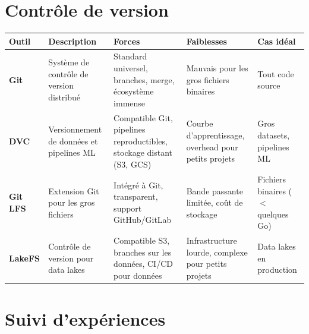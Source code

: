 \section{Contr\^ole de version}
\label{app:version-control}

\begin{center}
\small
\begin{tabular}{@{}p{1.8cm}p{3cm}p{3cm}p{3cm}p{2cm}@{}}
\toprule
\textbf{Outil} & \textbf{Description} & \textbf{Forces} &
  \textbf{Faiblesses} & \textbf{Cas id\'eal} \\
\midrule
\textbf{Git} & Syst\`eme de contr\^ole de version distribu\'e &
  Standard universel, branches, merge, \'ecosyst\`eme immense &
  Mauvais pour les gros fichiers binaires &
  Tout code source \\
\addlinespace
\textbf{DVC} & Versionnement de donn\'ees et pipelines ML &
  Compatible Git, pipelines reproductibles, stockage distant (S3, GCS) &
  Courbe d'apprentissage, overhead pour petits projets &
  Gros datasets, pipelines ML \\
\addlinespace
\textbf{Git LFS} & Extension Git pour les gros fichiers &
  Int\'egr\'e \`a Git, transparent, support GitHub/GitLab &
  Bande passante limit\'ee, co\^ut de stockage &
  Fichiers binaires ($<$ quelques Go) \\
\addlinespace
\textbf{LakeFS} & Contr\^ole de version pour data lakes &
  Compatible S3, branches sur les donn\'ees, CI/CD pour donn\'ees &
  Infrastructure lourde, complexe pour petits projets &
  Data lakes en production \\
\bottomrule
\end{tabular}
\end{center}

\section{Suivi d'exp\'eriences}
\label{app:experiment-tracking}


